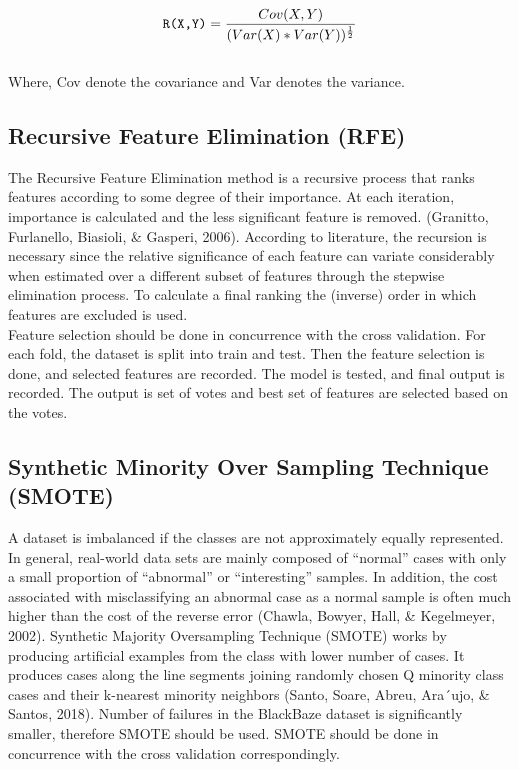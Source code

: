 \documentclass[conference]{IEEEtran}
\begin{document}
\begin{equation}
    \centering
    \verb|R(X,Y)| = \frac{Cov(X,Y)}{(Var(X) * Var(Y))^\frac{1}{2}}
\end{equation}
\\

Where, Cov denote the covariance and Var denotes the variance.

\subsection{Recursive Feature Elimination (RFE)}

The Recursive Feature Elimination method is a recursive process that ranks features according to some degree of their importance. At each iteration, importance is calculated and the less significant feature is removed. (Granitto, Furlanello, Biasioli, \& Gasperi, 2006). According to literature, the recursion is necessary since the relative significance of each feature can variate considerably when estimated over a different subset of features through the stepwise elimination process. To calculate a final ranking the (inverse) order in which features are excluded is used. \\ 

Feature selection should be done in concurrence with the cross validation. For each fold, the dataset is split into train and test. Then the feature selection is done, and selected features are recorded. The model is tested, and final output is recorded. The output is set of votes and best set of features are selected based on the votes.\\


\subsection{Synthetic Minority Over Sampling Technique (SMOTE)}
A dataset is imbalanced if the classes are not approximately equally represented. In general, real-world data sets are mainly composed of ``normal'' cases with only a small proportion of ``abnormal'' or ``interesting'' samples. In addition, the cost associated with misclassifying an abnormal case as a normal sample is often much higher than the cost of the reverse error (Chawla, Bowyer, Hall, \& Kegelmeyer, 2002). Synthetic Majority Oversampling Technique (SMOTE) works by producing artificial examples from the class with lower number of cases. It produces cases along the line segments joining randomly chosen Q minority class cases and their k-nearest minority neighbors (Santo, Soare, Abreu, Ara´ujo, \& Santos, 2018). Number of failures in the BlackBaze dataset is significantly smaller, therefore SMOTE should be used. SMOTE should be done in concurrence with the cross validation correspondingly.
\end{document}
